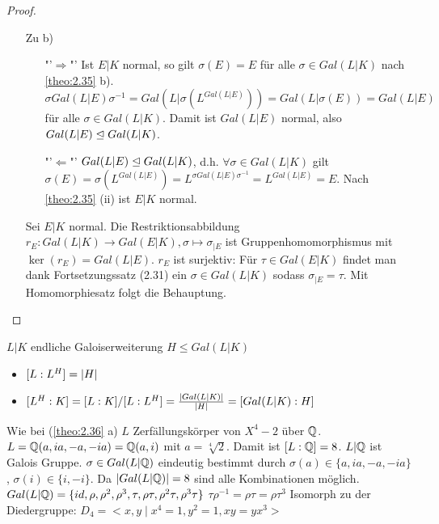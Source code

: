 \documentclass[../main.tex]{subfiles}
\begin{document}
\begin{proof}
\begin{itemize}[align= left]
    \item[Zu b)]$ $
    \begin{itemize}
        \item["'$\Rightarrow$"']
        Ist $E|K$ normal, so gilt $\sigma(E) = E$ für alle $\sigma \in Gal(L|K)$ nach \cref{theo:2.35} b).\\
        $\sigma Gal(L|E) \sigma^{-1} = Gal(L|\sigma(L^{Gal(L|E)})) = Gal(L|\sigma(E)) = Gal(L|E)$
        für alle $\sigma \in Gal(L|K)$.
        Damit ist $Gal(L|E)$ normal, also $Gal(L|E)\trianglelefteq Gal(L|K)$.
        \item["'$\Leftarrow$"']
        $Gal(L|E) \trianglelefteq Gal(L|K)$, d.h. $\forall \sigma\in Gal(L|K)$ gilt $\sigma(E)=\sigma(L^{Gal(L|E)}) = L^{\sigma Gal(L|E) \sigma^{-1}} = L^{Gal(L|E)} = E$.
        Nach \cref{theo:2.35} (ii) ist $E|K$ normal.
    \end{itemize}

    Sei $E|K$ normal.
    Die Restriktionsabbildung $r_E: Gal(L|K) \rightarrow Gal(E|K), \sigma \mapsto \sigma_{|E}$ ist Gruppenhomomorphismus mit $\ker(r_E) = Gal(L|E)$.
    $r_E$ ist surjektiv:
    Für $\tau\in Gal(E|K)$ findet man dank Fortsetzungssatz (2.31) ein $\sigma \in Gal(L|K)$ sodass $\sigma_{|E}=\tau$.
    Mit Homomorphiesatz folgt die Behauptung.
\end{itemize}
\end{proof}
\begin{remark}
    $L|K$ endliche Galoiserweiterung $H\leq Gal(L|K)$
    \begin{itemize}
        \item $[L:L^H] = \left\vert H \right\vert$
        \item $[L^H:K] = [L:K]/[L:L^H] = \frac{\left\vert Gal(L|K) \right\vert}{\left\vert H \right\vert} = [Gal(L|K):H]$
    \end{itemize}
\end{remark}
\begin{example}
    Wie bei (\cref{theo:2.36} a)
    $L$ Zerfällungskörper von $X^4-2$ über $\mathbb{Q}$.
    $L = \mathbb{Q}(a, ia, -a, -ia) = \mathbb{Q}(a,i)$ mit $a=\sqrt[4]{2}$.
    Damit ist $[L:\mathbb{Q}] = 8$.
    $L|\mathbb{Q}$ ist Galois Gruppe.
    $\sigma\in Gal(L|\mathbb{Q})$ eindeutig bestimmt durch $\sigma(a)\in \{a,ia,-a,-ia\}$, $\sigma(i)\in \{i,-i\}$.
    Da $\left\vert Gal(L|\mathbb{Q}) \right\vert = 8$ sind alle Kombinationen möglich.
    \TODO[Graphik]
    $Gal(L|\mathbb{Q}) = \{id,\rho,\rho^2,\rho^3,\tau,\rho\tau,\rho^2\tau,\rho^3\tau\}$ %
    $\tau\rho^{-1}=\rho \tau = \rho\tau^3$ %
    Isomorph zu der Diedergruppe:
    $D_4 = <x,y\mid x^4=1, y^2=1,xy=yx^3>$
\end{example}
\end{document}
